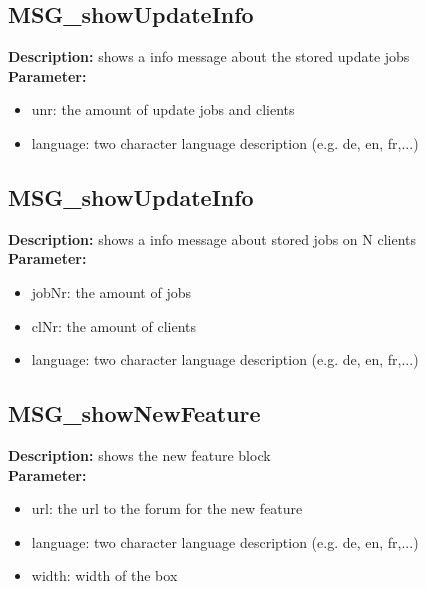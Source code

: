 \subsection{MSG\_showUpdateInfo}
\textbf{Description:} shows a info message about the stored update jobs\\
\textbf{Parameter:}
\begin{itemize}
\item unr: the amount of update jobs and clients
\item language: two character language description (e.g. de, en, fr,...)
\end{itemize}

\subsection{MSG\_showUpdateInfo}
\textbf{Description:} shows a info message about stored jobs on N clients\\
\textbf{Parameter:}
\begin{itemize}
\item jobNr: the amount of jobs
\item clNr: the amount of clients
\item language: two character language description (e.g. de, en, fr,...)
\end{itemize}

\subsection{MSG\_showNewFeature}
\textbf{Description:} shows the new feature block\\
\textbf{Parameter:}
\begin{itemize}
\item url: the url to the forum for the new feature
\item language: two character language description (e.g. de, en, fr,...)
\item width: width of the box
\end{itemize}

